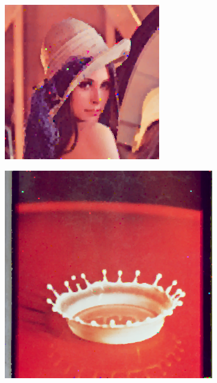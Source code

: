 \begin{subfigure}{0.9\textwidth}
   \centering
\begin{subfigure}[t]{0.15\textwidth}
    \includegraphics[width=0.9\linewidth]{../images/outputs/denoise/hg/hg0.png}
    
    \centering
  \end{subfigure}
\begin{subfigure}[t]{0.15\textwidth}
    \includegraphics[width=0.9\linewidth]{../images/outputs/denoise/hg/hg1.png}
    

\end{subfigure}
\end{subfigure}
